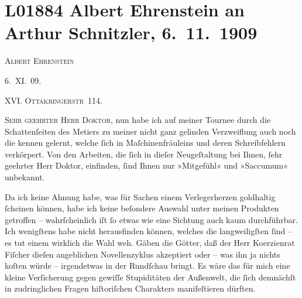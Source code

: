

\section[Albert Ehrenstein an Arthur Schnitzler, 6. 11. 1909]{L01884 Albert Ehrenstein an Arthur Schnitzler, 6. 11. 1909}
\nopagebreak{}
\rehead{ }\normalsize\beginnumbering{}
\toendnotes[C]{\smallbreak\pagebreak[2]}
\pstart
           
\pstart
           {\pb}\textsc{Albert Ehrenstein}\pend
           
\pstart
           \raggedleft{}6. XI. 09. \pend
           \pend
           
\pstart
           \textsc{XVI. Ottakringerstr 114.}\pend
           
\pstart{}\textsc{Sehr geehrter Herr Doktor,}\pend\vspace{0.5em}
\pstart
           nun habe ich auf meiner Tournee durch die Schattenſeiten des Metiers zu meiner nicht
               ganz gelinden Verzweiflung auch noch die kennen gelernt, welche ſich in
               Maſchinenfräuleins und deren Schreibfehlern verkörpert. Von den Arbeiten, die ſich in
               dieſer Neugeſtaltung bei Ihnen, ſehr geehrter Herr Doktor, einfinden, ſind Ihnen nur
                  »Mitgefühl« und »Saccumum« unbekannt.\pend
           
\pstart
           Da ich keine Ahnung habe, was für Sachen einem Verlegerherzen goldhaltig ſcheinen
               können, habe ich keine beſondere Auswahl {\pb}unter meinen Produkten getroffen – wahrſcheinlich iſt ſo etwas wie eine Sichtung
               auch kaum durchführbar. Ich wenigſtens habe nicht herausfinden können, welches die
               langweiligſten ſind – es tut einem wirklich die Wahl weh. Gäben die Götter, daß der
               Herr Ko{\geminationm}erzienrat Fiſcher dieſen angeblichen Novellenzyklus akzeptiert oder – was ihn ja
               nichts koſten würde – irgendetwas in der Rundſchau bringt. Es wäre das für mich eine kleine Verſicherung gegen
               gewiſſe Stupiditäten der Außenwelt, die ſich demnächſt in zudringlichen Fragen
               hiſtoriſchen Charakters manifeſtieren dürften.\pend
           
